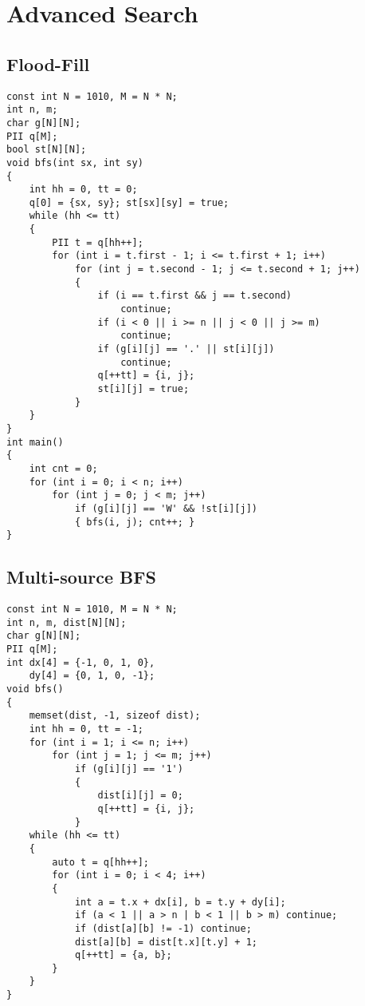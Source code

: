 \chapter{Advanced Search}\label{chap:AdvancedSearch}
\section{Flood-Fill}
\begin{lstlisting}
const int N = 1010, M = N * N;
int n, m;
char g[N][N];
PII q[M];
bool st[N][N];
void bfs(int sx, int sy)
{
    int hh = 0, tt = 0;
    q[0] = {sx, sy}; st[sx][sy] = true;
    while (hh <= tt)
    {
        PII t = q[hh++];
        for (int i = t.first - 1; i <= t.first + 1; i++)
            for (int j = t.second - 1; j <= t.second + 1; j++)
            {
                if (i == t.first && j == t.second)
                    continue;
                if (i < 0 || i >= n || j < 0 || j >= m)
                    continue;
                if (g[i][j] == '.' || st[i][j])
                    continue;
                q[++tt] = {i, j};
                st[i][j] = true;
            }
    }
}
int main()
{
    int cnt = 0;
    for (int i = 0; i < n; i++)
        for (int j = 0; j < m; j++)
            if (g[i][j] == 'W' && !st[i][j])
            { bfs(i, j); cnt++; }
}
\end{lstlisting}
\section{Multi-source BFS}
\begin{lstlisting}
const int N = 1010, M = N * N;
int n, m, dist[N][N];
char g[N][N];
PII q[M];
int dx[4] = {-1, 0, 1, 0}, 
    dy[4] = {0, 1, 0, -1};
void bfs()
{
    memset(dist, -1, sizeof dist);
    int hh = 0, tt = -1;
    for (int i = 1; i <= n; i++)
        for (int j = 1; j <= m; j++)
            if (g[i][j] == '1')
            {
                dist[i][j] = 0;
                q[++tt] = {i, j};
            }
    while (hh <= tt)
    {
        auto t = q[hh++];
        for (int i = 0; i < 4; i++)
        {
            int a = t.x + dx[i], b = t.y + dy[i];
            if (a < 1 || a > n | b < 1 || b > m) continue;
            if (dist[a][b] != -1) continue;
            dist[a][b] = dist[t.x][t.y] + 1;
            q[++tt] = {a, b};
        }
    }
}
\end{lstlisting}
